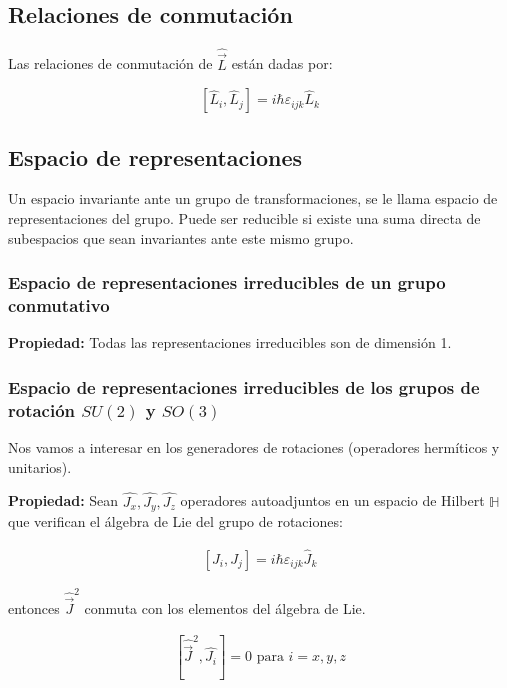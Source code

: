 \subsection{Relaciones de conmutación}

Las relaciones de conmutación de $\hat{\vec{L}}$ están dadas por:

\begin{equation}
    \left[\hat{L}_i,\hat{L}_j\right]=i\hbar\varepsilon_{ijk}\hat{L}_k
\end{equation}

\subsection{Espacio de representaciones}

Un espacio invariante ante un grupo de transformaciones, se le llama espacio de representaciones del grupo.
Puede ser reducible si existe una suma directa de subespacios que sean invariantes ante este mismo grupo.

\subsubsection{Espacio de representaciones irreducibles de un grupo conmutativo}

\textbf{Propiedad:} Todas las representaciones irreducibles son de dimensión 1.

\subsubsection{Espacio de representaciones irreducibles de los grupos de rotación $SU(2)$ y  $SO(3)$}

Nos vamos a interesar en los generadores de rotaciones (operadores hermíticos y unitarios).

\textbf{Propiedad:}
Sean $\hat{J_x},\hat{J_y},\hat{J_z}$  operadores autoadjuntos en un espacio de Hilbert $\mathbb{H}$ que verifican el álgebra de Lie del grupo de rotaciones:

\begin{align}
    \left[J_i,J_j\right]=i\hbar\varepsilon_{ijk}\hat{J}_k
\end{align}

entonces ${\hat{\vec{J}}}^2$ conmuta con los elementos del álgebra de Lie.

\begin{align*}
    \left[{\hat{\vec{J}}}^2,\hat{J_i}\right]=0 \text{ para } i=x,y,z
\end{align*}

